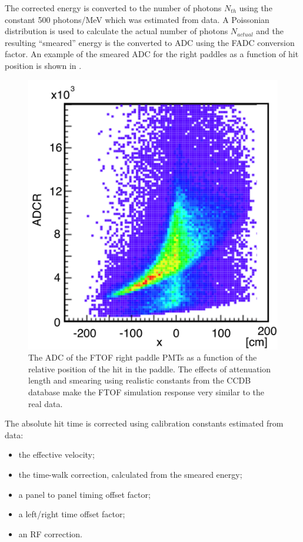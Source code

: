 The corrected energy is converted to the number of photons $N_{th}$ using the constant 500 photons/MeV
which was estimated from data.
A Poissonian distribution is used to calculate the actual number of photons $N_{actual}$ and the resulting ``smeared'' energy
is the converted to ADC using the FADC conversion factor.
An example of the smeared ADC for the right paddles as a function of hit position is shown in .

\begin{figure}
	\centering
	\includegraphics[width=0.99\columnwidth,keepaspectratio]{img/ftofAtten.png}
	\caption{The ADC of the FTOF right paddle PMTs as a function of the relative position of the hit in the paddle.
             The effects of attenuation length and smearing using realistic constants from the CCDB database make
             the FTOF simulation response very similar to the real data.}
	\label{fig:ftofAtten}
\end{figure}

The absolute hit time is corrected using calibration constants estimated from data:

\begin{itemize}
	\item the effective velocity;
	\item the time-walk correction, calculated from the smeared energy;
	\item a panel to panel timing offset factor;
	\item a left/right time offset factor;
	\item an RF correction.
\end{itemize}

